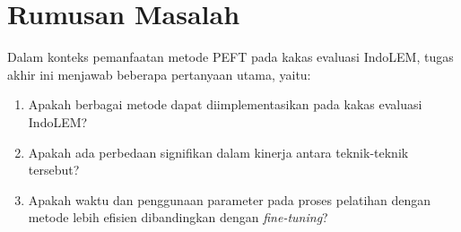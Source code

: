\section{Rumusan Masalah}

Dalam konteks pemanfaatan metode PEFT pada kakas evaluasi IndoLEM, tugas akhir ini menjawab beberapa pertanyaan utama, yaitu:

\begin{enumerate}
    \item Apakah berbagai metode \PEFT dapat diimplementasikan pada kakas evaluasi IndoLEM?
    \item Apakah ada perbedaan signifikan dalam kinerja antara teknik-teknik \PEFT tersebut?
    \item Apakah waktu dan penggunaan parameter pada proses pelatihan dengan metode \PEFT lebih efisien dibandingkan dengan \textit{fine-tuning}?
\end{enumerate}
